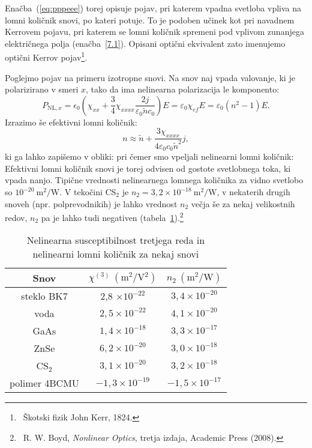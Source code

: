 Enačba~(\ref{eq:pppeee}) 
torej opisuje pojav, 
pri katerem vpadna svetloba vpliva na lomni količnik snovi, po kateri 
potuje.
To je podoben učinek kot pri navadnem Kerrovem pojavu, pri katerem se lomni količnik 
spremeni pod vplivom zunanjega električnega polja (enačba~\ref{7.1}).
Opisani optični ekvivalent zato imenujemo optični 
Kerrov pojav\footnote{~Škotski fizik John Kerr, 1824.}.

Poglejmo pojav na primeru izotropne snovi. Na snov naj vpada valovanje, ki je polarizirano
v smeri $x$, tako da ima nelinearna polarizacija le komponento:
\begin{equation}
P_{\mathrm{NL},x}=
\epsilon_{0} \left(\chi_{xx} +\frac{3}{4} \chi_{xxxx}\frac{2 j }
{\varepsilon_0 \tilde{n} c_0}\right)E = \varepsilon_0 \chi_{ef}E = \varepsilon_0 (n^2-1) E.
\end{equation}
Izrazimo še efektivni lomni količnik:
\begin{equation}
n \approx \tilde{n} + \frac{3 \chi_{xxxx}}{4 \varepsilon_0 c_0 \tilde{n}^2} j,
\end{equation}
ki ga lahko zapišemo v obliki:
pri čemer smo vpeljali nelinearni lomni količnik:
Efektivni lomni količnik snovi je torej odvisen od gostote svetlobnega toka, ki vpada nanjo. 
Tipične vrednosti nelinearnega lomnega količnika za vidno svetlobo so $10^{-20}~\si{\metre^2/\watt}$.
V tekočini CS$_2$ je $n_2 = 3,2 \times 10^{-18}~\si{\metre^2/\watt}$, v nekaterih 
drugih snoveh (npr. polprevodnikih) je lahko vrednost $n_2$ večja še za nekaj 
velikostnih redov, $n_2$ pa je lahko tudi negativen (tabela~\ref{table:chi3}).\footnote{~R.
W. Boyd, {\it Nonlinear Optics}, tretja izdaja, Academic Press (2008).}

\begin{table}[ht]
 \centering
\begin{tabular}{|c|c|c|} \hline  
      Snov & $\chi^{(3)}~(\si{\metre^2/\volt^2})$ & $n_2~(\si{\metre^2/\watt})$\\ \hline
     steklo BK7 & 2,8 $\times 10^{-22}$ & $3,4 \times 10^{-20}$ \\ \hline
     voda & $2,5 \times 10^{-22}$ & $4,1 \times 10^{-20}$ \\ \hline
     GaAs & $1,4 \times 10^{-18}$ & $3,3 \times 10^{-17}$ \\ \hline\index{GaAs}
     ZnSe & $6,2 \times 10^{-20}$ & $3,0 \times 10^{-18}$ \\ \hline\index{ZnSe}
     CS$_2$ & $3,1 \times 10^{-20}$ & $3,2 \times 10^{-18}$ \\ \hline \index{CS$_2$}
     polimer 4BCMU  & $-1,3 \times 10^{-19}$ & $-1,5 \times 10^{-17}$ \\ \hline      
\end{tabular}
  \caption{Nelinearna susceptibilnost tretjega reda in nelinearni lomni količnik za nekaj snovi}
\label{table:chi3}
\end{table}


